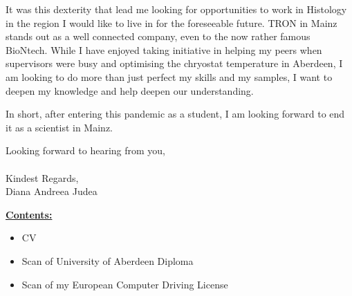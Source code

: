 \documentclass[paper=a4,fontsize=11pt]{scrartcl} %
\newcommand{\sepspace}{\vspace*{1em}}		%
\begin{document}
  \sepspace 
  \noindent It was this dexterity that lead me looking for opportunities to
  work in Histology in the region I would like to live in for the foreseeable
  future.  TRON in Mainz stands out as a well connected company, even to the
  now rather famous BioNtech.  While I have enjoyed taking initiative in
  helping my peers when supervisors were busy and optimising the chryostat
  temperature in Aberdeen, I am looking to do more than just perfect my skills
  and my samples, I want to deepen my knowledge and help deepen our
  understanding.  

  \sepspace

  \noindent In short, after entering this pandemic as a student, I am looking
  forward to end it as a scientist in Mainz.
  \sepspace

  \noindent
  Looking forward to hearing from you, \\\\
  Kindest Regards,\\
  Diana Andreea Judea
  \sepspace


  \vspace*{\fill}
  
  \textbf{\underline{Contents:}}
  \begin{itemize}[noitemsep,topsep=0pt]
    \setlength\itemsep{1pt}
    \item CV
    \item Scan of University of Aberdeen Diploma
    \item Scan of my European Computer Driving License
  \end{itemize}
  
  \cleardoublepage
  
  \cleardoublepage
  

\end{document}
